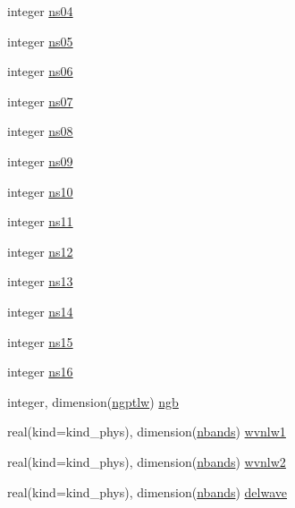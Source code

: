 \begin{DoxyCompactItemize}
\item 
integer \hyperlink{group__module__radlw__main_ga57f85389c924ba16fad61578170eadcc}{ns04}
\item 
integer \hyperlink{group__module__radlw__main_ga6bb5413129239f08596d4e7233c666a5}{ns05}
\item 
integer \hyperlink{group__module__radlw__main_gab936172cdf831f0b956c1475f175eca2}{ns06}
\item 
integer \hyperlink{group__module__radlw__main_gac60030c5a4655c6cee7be71dd527ffdc}{ns07}
\item 
integer \hyperlink{group__module__radlw__main_ga0a9944341bfe4507370bb6b617ac0476}{ns08}
\item 
integer \hyperlink{group__module__radlw__main_ga8948c9fe0a0f209c62e17e7c526940b8}{ns09}
\item 
integer \hyperlink{group__module__radlw__main_ga66d1bbe720448a035ccf689d77418cd5}{ns10}
\item 
integer \hyperlink{group__module__radlw__main_gace01958b71c7f6923fd9b3ba39b3b668}{ns11}
\item 
integer \hyperlink{group__module__radlw__main_gaabdc77471aadc2932eb213f3b7ecb66c}{ns12}
\item 
integer \hyperlink{group__module__radlw__main_ga239c74495526cdf72b28e1f5c1d0318e}{ns13}
\item 
integer \hyperlink{group__module__radlw__main_ga1d49c23da2ed69069a97f861a28a531e}{ns14}
\item 
integer \hyperlink{group__module__radlw__main_ga9662e6bd344b1dbbfa7cc4429753bb10}{ns15}
\item 
integer \hyperlink{group__module__radlw__main_ga3a7ba0b8f35271e7979deea86f834479}{ns16}
\item 
integer, dimension(\hyperlink{group__module__radlw__main_ga05fe17fe932ce62a3ae2c6c564584321}{ngptlw}) \hyperlink{group__module__radlw__main_ga2c571bd14c9b7982a7968976858c7547}{ngb}
\item 
real(kind=kind\+\_\+phys), dimension(\hyperlink{group__module__radlw__main_ga48e11b992a80595d71c92f7c9bfbe19c}{nbands}) \hyperlink{group__module__radlw__main_ga3a7370a94889d0cbaf6057404830d978}{wvnlw1}
\item 
real(kind=kind\+\_\+phys), dimension(\hyperlink{group__module__radlw__main_ga48e11b992a80595d71c92f7c9bfbe19c}{nbands}) \hyperlink{group__module__radlw__main_gace30abd03d144096ee6b444b46081b58}{wvnlw2}
\item 
real(kind=kind\+\_\+phys), dimension(\hyperlink{group__module__radlw__main_ga48e11b992a80595d71c92f7c9bfbe19c}{nbands}) \hyperlink{group__module__radlw__main_ga6ad1dff8ffc039d03c5cf3059344308e}{delwave}
\end{DoxyCompactItemize}


